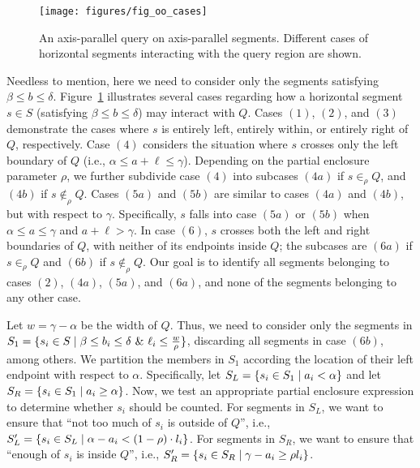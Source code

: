 \begin{figure}[t]
\centering
\texttt{[image: figures/fig\_oo\_cases]}
\caption{An axis-parallel query on axis-parallel segments. Different cases 
of horizontal segments interacting with the query region are shown.}
\label{:fig:rectangles:ap:cases}
\end{figure}

Needless to mention, here we need to consider only the segments 
satisfying $\beta \leq b \leq \delta$. 
Figure~\ref{:fig:rectangles:ap:cases} illustrates several cases 
regarding how a horizontal segment $s \in S$ (satisfying $\beta 
\leq b \leq \delta$) may interact with $Q$. 
Cases $(1)$, $(2)$, and $(3)$ demonstrate the cases where $s$ is 
entirely left, entirely within, or entirely right of $Q$, 
respectively. Case $(4)$ considers the situation where $s$ crosses 
only the left boundary of $Q$ (i.e., $\alpha \leq a+\ell \leq \gamma$). 
Depending on the partial enclosure parameter $\rho$, we further 
subdivide case $(4)$ into subcases $(4a)$ if $s \in_\rho Q$, and 
$(4b)$ if $s \not \in_\rho Q$. Cases $(5a)$ and $(5b)$ are similar 
to cases $(4a)$ and $(4b)$, but with respect to $\gamma$. Specifically, 
$s$ falls into case $(5a)$ or $(5b)$ when $\alpha \leq a \leq \gamma$ 
and $a+\ell > \gamma$. In case $(6)$, $s$ crosses both the left and right 
boundaries of $Q$, with neither of its endpoints inside $Q$;
the subcases are $(6a)$ if $s \in_\rho Q$ and $(6b)$ if $s \not 
\in_\rho Q$.
Our goal is to identify all segments belonging to cases $(2)$, $(4a)$, $(5a)$, and $(6a)$, and none of the segments belonging to any other case.

Let $w = \gamma - \alpha$ be the width of $Q$. Thus, we need to consider 
only the segments in $S_1 = \{s_i \in S \;|\; \beta \leq b_i \leq \delta 
~\&~ \ell_i \leq \frac{w}{\rho}\}$, discarding all segments in case $(6b)$, among others.
We partition the members in $S_1$ 
according the location of their left endpoint with respect to $\alpha$. 
Specifically, let $S_L = \{s_i \in S_1 \;|\; a_i < \alpha\}$ and let 
$S_R = \{s_i \in S_1 \;|\; a_i \geq \alpha\}$.
Now, we test an appropriate partial enclosure expression to determine 
whether $s_i$ should be counted. For segments in $S_L$, we want to 
ensure that ``not too much of $s_i$ is outside of $Q$'', i.e., $S_L' 
= \{ s_i \in S_L \;|\; \alpha - a_i < (1 - \rho) \cdot l_i\}$.
For segments in $S_R$, we want to ensure that ``enough of $s_i$ is inside 
$Q$'', i.e., $S_R' = \{s_i \in S_R \;|\; \gamma - a_i \geq  \rho l_i\}$.

